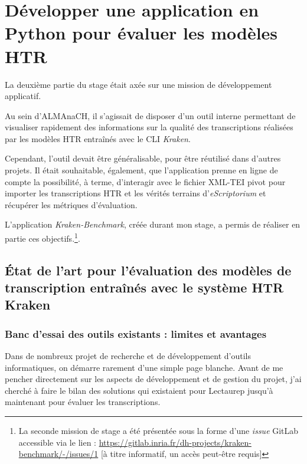 \part{Développer une application en Python pour évaluer les modèles HTR}\label{partie_3}

La deuxième partie du stage était axée sur une mission de développement applicatif. 

Au sein d'ALMAnaCH, il s'agissait de disposer d'un outil interne permettant de visualiser rapidement des informations sur la qualité des transcriptions réalisées par les modèles HTR entraînés avec le CLI \textit{Kraken}. 

Cependant, l'outil devait être généralisable, pour être réutilisé dans d'autres projets. Il était souhaitable, également, que l'application prenne en ligne de compte la possibilité, à terme, d'interagir avec le fichier XML-TEI pivot pour importer les transcriptions HTR et les vérités terrains d'\textit{eScriptorium} et récupérer les métriques d'évaluation. 

L'application \textit{Kraken-Benchmark}, créée durant mon stage, a permis de réaliser en partie ces objectifs.\footnote{La seconde mission de stage a été présentée sous la forme d'une \textit{issue} GitLab accessible via le lien : \url{https://gitlab.inria.fr/dh-projects/kraken-benchmark/-/issues/1} [à titre informatif, un accès peut-être requis]}.\\ 

\clearpage
\thispagestyle{empty}
\chapter{État de l'art pour l'évaluation des modèles de transcription entraînés avec le système HTR Kraken}

\section{Banc d'essai des outils existants : limites et avantages}

Dans de nombreux projet de recherche et de développement d'outils informatiques, on démarre rarement d'une simple page blanche. Avant de me pencher directement sur les aspects de développement et de gestion du projet, j'ai cherché à faire le bilan des solutions qui existaient pour Lectaurep jusqu'à maintenant pour évaluer les transcriptions.\\

